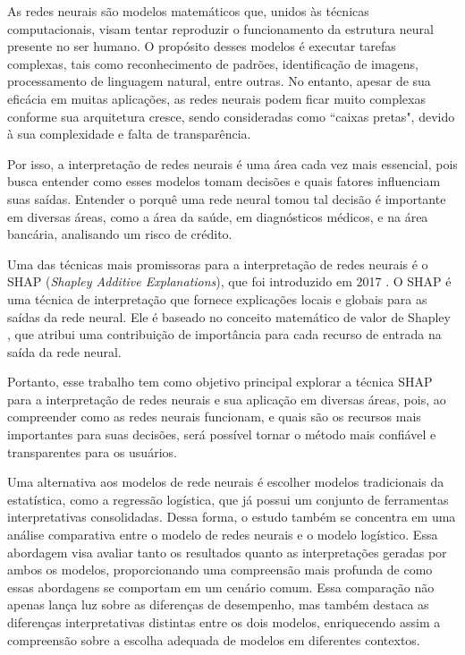 As redes neurais são modelos matemáticos que, unidos às técnicas computacionais, visam tentar reproduzir
 o funcionamento da estrutura neural presente no ser humano.
 O propósito desses modelos é executar tarefas complexas, tais como reconhecimento de padrões, identificação de imagens, 
 processamento de linguagem natural, entre outras.
  No entanto, apesar de sua eficácia em muitas aplicações, as redes neurais podem ficar muito complexas
   conforme sua arquitetura cresce, sendo consideradas como ``caixas pretas", devido à sua complexidade 
   e falta de transparência. 

Por isso, a interpretação de redes neurais é uma área cada vez mais essencial, pois busca entender como
 esses modelos tomam decisões e quais fatores influenciam suas saídas. Entender o porquê uma rede 
 neural tomou tal decisão é importante em diversas áreas, como a área da saúde, em diagnósticos médicos, 
 e na área bancária, analisando um risco de crédito.

Uma das técnicas mais promissoras para a interpretação de redes neurais é o SHAP (\textit{Shapley Additive Explanations}), 
que foi introduzido em 2017 \cite{lundberg2017unified}. O SHAP é uma técnica de interpretação que fornece explicações
 locais e globais para as saídas da rede neural. Ele é baseado no conceito matemático de valor de Shapley \cite{shapley1953value},
  que atribui uma contribuição de importância para cada recurso de entrada na saída da rede neural.

Portanto, esse trabalho tem como objetivo principal explorar a técnica SHAP para a interpretação de redes neurais 
e sua aplicação em diversas áreas, pois, ao compreender como as redes neurais funcionam, e quais são os 
recursos mais importantes para suas decisões, será possível tornar o método mais confiável e transparentes para os usuários. 


Uma alternativa aos modelos de rede neurais é escolher modelos tradicionais da estatística, 
como a regressão logística, que já possui um conjunto de ferramentas
interpretativas consolidadas. Dessa forma, o estudo também se concentra em uma análise comparativa entre o modelo de redes neurais e 
o modelo logístico. Essa abordagem visa avaliar tanto os resultados quanto as interpretações geradas por ambos os modelos,
proporcionando uma compreensão mais profunda de como essas abordagens se comportam em um cenário comum. Essa comparação não
apenas lança luz sobre as diferenças de desempenho, mas também destaca as diferenças interpretativas distintas entre os dois
modelos, enriquecendo assim a compreensão sobre a escolha adequada de modelos em diferentes contextos.